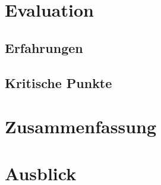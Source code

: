 \section{Evaluation}
\subsection{Erfahrungen}
\subsection{Kritische Punkte}

\section{Zusammenfassung}


\section{Ausblick}